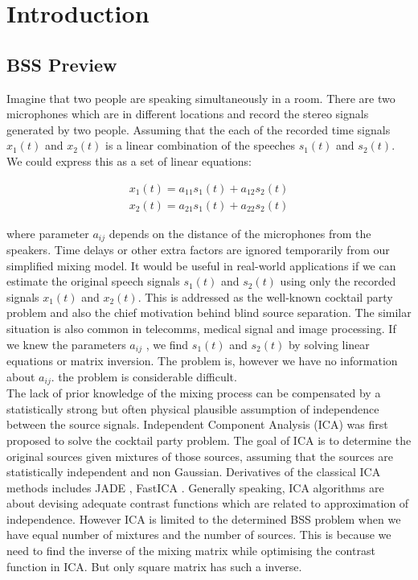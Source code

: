 \section{Introduction} \label{intro}
\subsection{BSS Preview}
Imagine that two people are speaking simultaneously in a room. There are two microphones which are in different locations and record the stereo signals generated by two people. Assuming that the each of the recorded time signals $x_1(t)$ and $x_2(t)$ is a linear combination of the speeches $s_1(t)$ and $s_2(t)$. We could express this as a set of linear equations:

\begin{align}
    x_1(t) = a_{11}s_1(t) + a_{12}s_2(t)\\
    x_2(t) = a_{21}s_1(t) + a_{22}s_2(t)
\end{align}

where parameter $a_{ij}$ depends on the distance of the microphones from the speakers. Time delays or other extra factors are ignored temporarily from our simplified mixing model. It would be useful in real-world applications if we can estimate the original speech signals $s_1(t)$ and $s_2(t)$ using only the recorded signals $x_1(t)$ and $x_2(t)$. This is addressed as the well-known cocktail party problem and also the chief motivation behind blind source separation. The similar situation is also common in telecomms, medical signal and image processing. If we knew the parameters $a_{ij}$ , we find $s_1(t)$ and $s_2(t)$  by solving linear equations or matrix inversion. The problem is, however we have no information about $a_{ij}$. the problem is considerable difficult.\\

The lack of prior knowledge of the mixing process can be compensated by a statistically strong but often physical plausible assumption of independence between the source signals. Independent Component Analysis (ICA) was first proposed to solve the cocktail party problem. The goal of ICA is to determine the original sources given mixtures of those sources, assuming that the sources are statistically independent and non Gaussian. Derivatives of the classical ICA methods includes JADE \cite{JADE720250}, FastICA \cite{fastICA777510}. Generally speaking, ICA algorithms are about devising adequate contrast functions which are related to approximation of independence\cite{HYVARINEN2000411}. However ICA is limited to the determined BSS problem when we have equal number of mixtures and the number of sources. This is because we need to find the inverse of the mixing matrix while optimising the contrast function in ICA. But only square matrix has such a inverse. 


